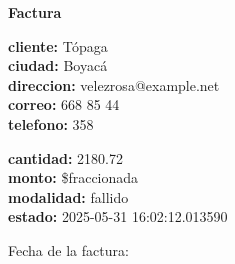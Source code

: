 \documentclass{article}
\begin{document}
\begin{center}
    {\LARGE \textbf{Factura}}\\[1cm]
\end{center}

\textbf{cliente:} Tópaga \\
\textbf{ciudad:} Boyacá \\
\textbf{direccion:} velezrosa@example.net \\
\textbf{correo:} 668 85 44 \\
\textbf{telefono:} 358 \\

\vspace{0.5cm}

\textbf{cantidad:} 2180.72 \\
\textbf{monto:} \$fraccionada \\
\textbf{modalidad:} fallido \\
\textbf{estado:} 2025-05-31 16:02:12.013590 \\

\vspace{1cm}

Fecha de la factura: 
\end{document}

